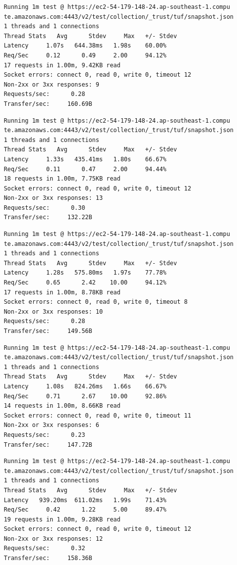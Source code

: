 \documentclass[a4paper,12pt]{article}
\newcounter{subsubsubsection}[subsubsection]
\begin{document}
{{	
	\begin{verbatim}
	Running 1m test @ https://ec2-54-179-148-24.ap-southeast-1.compu
	te.amazonaws.com:4443/v2/test/collection/_trust/tuf/snapshot.json
	1 threads and 1 connections
	Thread Stats   Avg      Stdev     Max   +/- Stdev
	Latency     1.07s   644.38ms   1.98s    60.00%
	Req/Sec     0.12      0.49     2.00     94.12%
	17 requests in 1.00m, 9.42KB read
	Socket errors: connect 0, read 0, write 0, timeout 12
	Non-2xx or 3xx responses: 9
	Requests/sec:      0.28
	Transfer/sec:     160.69B
	\end{verbatim}
	\begin{verbatim}
	Running 1m test @ https://ec2-54-179-148-24.ap-southeast-1.compu
	te.amazonaws.com:4443/v2/test/collection/_trust/tuf/snapshot.json
	1 threads and 1 connections
	Thread Stats   Avg      Stdev     Max   +/- Stdev
	Latency     1.33s   435.41ms   1.80s    66.67%
	Req/Sec     0.11      0.47     2.00     94.44%
	18 requests in 1.00m, 7.75KB read
	Socket errors: connect 0, read 0, write 0, timeout 12
	Non-2xx or 3xx responses: 13
	Requests/sec:      0.30
	Transfer/sec:     132.22B
	\end{verbatim}
	\begin{verbatim}
	Running 1m test @ https://ec2-54-179-148-24.ap-southeast-1.compu
	te.amazonaws.com:4443/v2/test/collection/_trust/tuf/snapshot.json
	1 threads and 1 connections
	Thread Stats   Avg      Stdev     Max   +/- Stdev
	Latency     1.28s   575.80ms   1.97s    77.78%
	Req/Sec     0.65      2.42    10.00     94.12%
	17 requests in 1.00m, 8.78KB read
	Socket errors: connect 0, read 0, write 0, timeout 8
	Non-2xx or 3xx responses: 10
	Requests/sec:      0.28
	Transfer/sec:     149.56B
	\end{verbatim}
	\newpage
	\begin{verbatim}
	Running 1m test @ https://ec2-54-179-148-24.ap-southeast-1.compu
	te.amazonaws.com:4443/v2/test/collection/_trust/tuf/snapshot.json
	1 threads and 1 connections
	Thread Stats   Avg      Stdev     Max   +/- Stdev
	Latency     1.08s   824.26ms   1.66s    66.67%
	Req/Sec     0.71      2.67    10.00     92.86%
	14 requests in 1.00m, 8.66KB read
	Socket errors: connect 0, read 0, write 0, timeout 11
	Non-2xx or 3xx responses: 6
	Requests/sec:      0.23
	Transfer/sec:     147.72B
	\end{verbatim}
	\begin{verbatim}
	Running 1m test @ https://ec2-54-179-148-24.ap-southeast-1.compu
	te.amazonaws.com:4443/v2/test/collection/_trust/tuf/snapshot.json
	1 threads and 1 connections
	Thread Stats   Avg      Stdev     Max   +/- Stdev
	Latency   939.20ms  611.02ms   1.99s    71.43%
	Req/Sec     0.42      1.22     5.00     89.47%
	19 requests in 1.00m, 9.28KB read
	Socket errors: connect 0, read 0, write 0, timeout 12
	Non-2xx or 3xx responses: 12
	Requests/sec:      0.32
	Transfer/sec:     158.36B
	\end{verbatim}
	\newpage
	
}}
\end{document}
